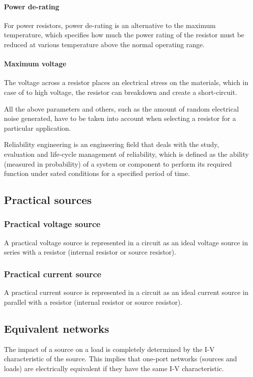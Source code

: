 \documentclass[10pt, twocolumn]{article}
\begin{document}
\paragraph{Power de-rating}
For power resistors, power de-rating is an alternative to the maximum temperature, which specifies how much the power rating of the resistor must be reduced at various temperature above the normal operating range.


\paragraph{Maximum voltage}
The voltage across a resistor places an electrical stress on the materials, which in case of to high voltage, the resistor can breakdown and create a short-circuit.

All the above parameters and others, such as the amount of random electrical noise generated, have to be taken into account when selecting a resistor for a particular application.

\begin{remark}
  Reliability engineering is an engineering field that deals with the study, evaluation and life-cycle management of reliability, which is defined as the ability (measured in probability) of a system or component to perform its required function under sated conditions for a specified period of time.
\end{remark}


\subsection{Practical sources}
\subsubsection{Practical voltage source}
A practical voltage source is represented in a circuit as an ideal voltage source in series with a resistor (internal resistor or source resistor).


\subsubsection{Practical current source}
A practical current source is represented in a circuit as an ideal current source in parallel with a resistor (internal resistor or source resistor).


\subsection{Equivalent networks}
The impact of a source on a load is completely determined by the I-V characteristic of the source.
This implies that one-port networks (sources and loads) are electrically equivalent if they have the same I-V characteristic.
\end{document}
